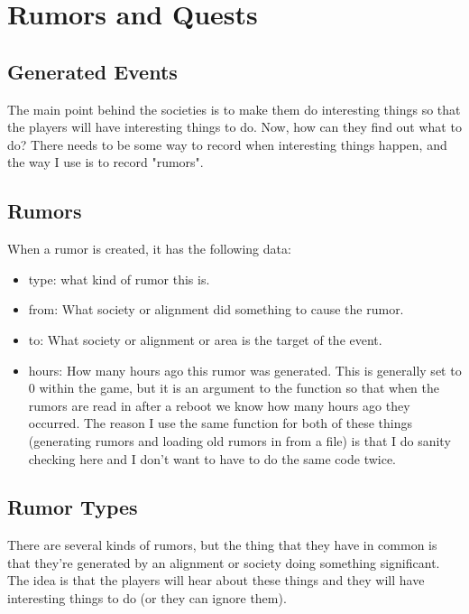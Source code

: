 \chapter{Rumors and Quests}

\section{Generated Events}

The main point behind the societies is to make them do interesting
things so that the players will have interesting things to do. Now,
how can they find out what to do? There needs to be some way to 
record when interesting things happen, and the way I use is to
record "rumors". 

\section{Rumors}

When a rumor is created, it has the following data:

\begin{itemize}

\item type: what kind of rumor this is.

\item from: What society or alignment did something to cause the
rumor.

\item to: What society or alignment or area is the target of the
event.

\item hours: How many hours ago this rumor was generated. This is generally
set to 0 within the game, but it is an argument to the function 
so that when the rumors are read in after a reboot we know how many
hours ago they occurred. The reason I use the same function for
both of these things (generating rumors and loading old rumors in
from a file) is that I do sanity checking here and I don't want to
have to do the same code twice.

\end{itemize}

\section{Rumor Types}

There are several kinds of rumors, but the thing that they have in common
is that they're generated by an alignment or society doing something
significant. The idea is that the players will hear about these things
and they will have interesting things to do  (or they can ignore them).


